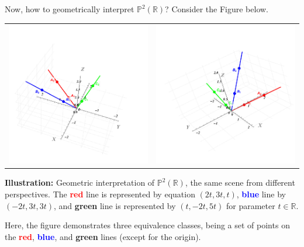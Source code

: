 \documentclass[../lecture-notes.tex]{subfiles}
\begin{document}
\begin{example}
    Now, how to geometrically interpret $\mathbb{P}^2(\mathbb{R})$? Consider the Figure below.

    \vspace{-2mm}

    \begin{center}
        \begin{tabular}{cc}
            \centering\includegraphics[trim={100 100 100 200}, width=0.45\linewidth, clip]{images/lecture_4/line_1_view_1.pdf} &
            \centering\includegraphics[trim={100 100 100 200}, width=0.45\linewidth, clip]{images/lecture_4/line_1_view_2.pdf}
        \end{tabular}
        \small{\textbf{Illustration:} Geometric interpretation of $\mathbb{P}^2(\mathbb{R})$, the same scene from different perspectives. The \textcolor{red}{\textbf{red}} line is represented by equation $(2t,3t,t)$, \textcolor{blue}{\textbf{blue}} line by $(-2t,3t,3t)$, and \textcolor{green!60!black}{\textbf{green}} line is represented by $(t,-2t,5t)$ for parameter $t \in \mathbb{R}$.}
    \end{center}

    \vspace{-1mm}

    Here, the figure demonstrates three equivalence classes, being a set of points on the \textcolor{red}{\textbf{red}}, \textcolor{blue}{\textbf{blue}}, and \textcolor{green!60!black}{\textbf{green}} lines (except for the origin). 
    

\end{example}
\end{document}
